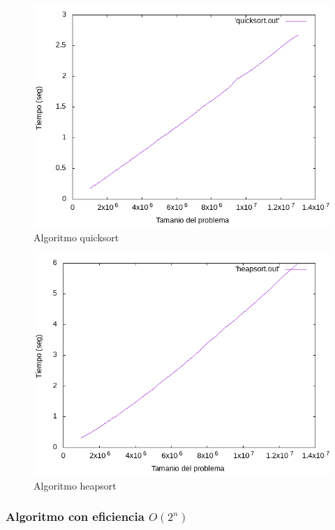 \documentclass[12pt,spanish]{article}
\begin{document}
\begin{figure}[H]
\centering
\includegraphics[scale=0.75]{empirica_quicksort.png}
\caption{Algoritmo quicksort}
\end{figure}

\begin{figure}[H]
\centering
\includegraphics[scale=0.75]{empirica_heapsort.png}
\caption{Algoritmo heapsort}
\end{figure}

\subsubsection{Algoritmo con eficiencia $O(2^n)$}
\end{document}
